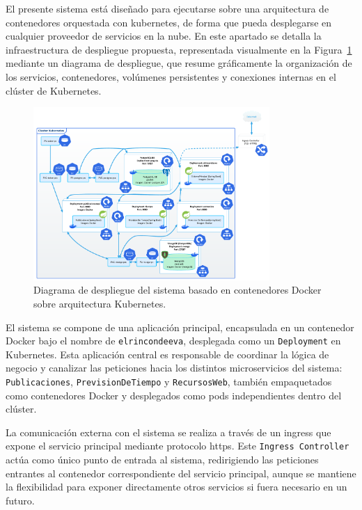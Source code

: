 El presente sistema está diseñado para ejecutarse sobre una arquitectura de contenedores orquestada con \gls{kubernetes}, de forma que pueda desplegarse en cualquier proveedor de servicios en la nube. 
En este apartado se detalla la infraestructura de despliegue propuesta, representada visualmente en la Figura~\ref{fig:diagrama_despliegue} mediante un diagrama de despliegue, que resume gráficamente la organización de los servicios, contenedores, volúmenes persistentes y conexiones internas en el clúster de Kubernetes.

\begin{figure}
    \centering
    \includegraphics[width=0.8\textwidth]{figs/despliegue-nube.pdf}
    \caption{Diagrama de despliegue del sistema basado en contenedores Docker sobre arquitectura Kubernetes.\label{fig:diagrama_despliegue}}
\end{figure}

El sistema se compone de una aplicación principal, encapsulada en un contenedor Docker bajo el nombre de \texttt{elrincondeeva}, desplegada como un \texttt{Deployment} en Kubernetes. Esta aplicación central es responsable de coordinar la lógica de negocio y canalizar las peticiones hacia los distintos \glspl{microservicio} del sistema: \texttt{Publicaciones}, \texttt{PrevisionDeTiempo} y \texttt{RecursosWeb}, también empaquetados como contenedores Docker y desplegados como pods independientes dentro del clúster.

La comunicación externa con el sistema se realiza a través de un \gls{ingress} que expone el servicio principal mediante protocolo \gls{https}. Este \texttt{Ingress Controller} actúa como único punto de entrada al sistema, redirigiendo las peticiones entrantes al contenedor correspondiente del servicio principal, aunque se mantiene la flexibilidad para exponer directamente otros servicios si fuera necesario en un futuro.

